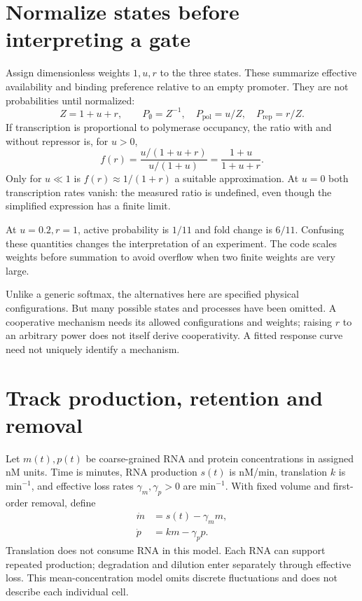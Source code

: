\section{Normalize states before interpreting a gate}
Assign dimensionless weights $1,u,r$ to the three states. These summarize
effective availability and binding preference relative to an empty promoter.
They are not probabilities until normalized:
\begin{equation}
 Z=1+u+r,\qquad P_{\emptyset}=Z^{-1},\quad
 P_{\mathrm{pol}}=u/Z,\quad P_{\mathrm{rep}}=r/Z.
\end{equation}
If transcription is proportional to polymerase occupancy, the ratio with
and without repressor is, for $u>0$,
\begin{equation}
 f(r)=\frac{u/(1+u+r)}{u/(1+u)}=\frac{1+u}{1+u+r}.
\end{equation}
Only for $u\ll1$ is $f(r)\approx1/(1+r)$ a suitable approximation.
At $u=0$ both transcription rates vanish: the measured ratio is undefined,
even though the simplified expression has a finite limit.
\begin{center}\end{center}
At $u=0.2,r=1$, active probability is $1/11$ and fold change is $6/11$.
Confusing these quantities changes the interpretation of an experiment.
The code scales weights before summation to avoid overflow when two finite
weights are very large.

Unlike a generic softmax, the alternatives here are specified physical
configurations. But many possible states and processes have been omitted.
A cooperative mechanism needs its allowed configurations and weights;
raising $r$ to an arbitrary power does not itself derive cooperativity.
A fitted response curve need not uniquely identify a mechanism.

\section{Track production, retention and removal}
Let $m(t),p(t)$ be coarse-grained RNA and protein concentrations in assigned
nM units. Time is minutes, RNA production $s(t)$ is nM/min,
translation $k$ is $\mathrm{min}^{-1}$, and effective loss rates
$\gamma_m,\gamma_p>0$ are $\mathrm{min}^{-1}$. With fixed volume and
first-order removal, define
\begin{align}
 \dot m&=s(t)-\gamma_m m,\\
 \dot p&=km-\gamma_p p.
\end{align}
Translation does not consume RNA in this model. Each RNA can support repeated
production; degradation and dilution enter separately through effective loss.
This mean-concentration model omits discrete fluctuations and does not
describe each individual cell.

